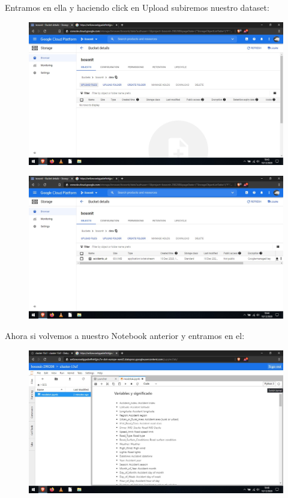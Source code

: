 \documentclass[a4paper,10pt]{article}
\begin{document}
Entramos en ella y haciendo click en Upload subiremos nuestro dataset:

\begin{figure}[H]
\begin{center}
\includegraphics[width=500pt]{./fotos/GoogleCloud/45 - GC.jpg}
\end{center}
\end{figure}

\begin{figure}[H]
\begin{center}
\includegraphics[width=500pt]{./fotos/GoogleCloud/46 - GC.jpg}
\end{center}
\end{figure}

Ahora si volvemos a nuestro Notebook anterior y entramos en el:

\begin{figure}[H]
\begin{center}
\includegraphics[width=500pt]{./fotos/GoogleCloud/47 - GC.jpg}
\end{center}
\end{figure}
\end{document}
